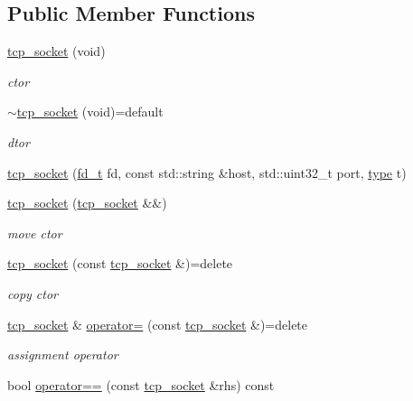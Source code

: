 \subsection*{Public Member Functions}
\begin{DoxyCompactItemize}
\item 
\hyperlink{classtacopie_1_1tcp__socket_a88ed1cadb0263591c4d31805e0a1a001}{tcp\+\_\+socket} (void)
\begin{DoxyCompactList}\small\item\em ctor \end{DoxyCompactList}\item 
\hyperlink{classtacopie_1_1tcp__socket_a4bd737a76a2a326be03d704f79a35282}{$\sim$tcp\+\_\+socket} (void)=default
\begin{DoxyCompactList}\small\item\em dtor \end{DoxyCompactList}\item 
\hyperlink{classtacopie_1_1tcp__socket_a191ffa48e0753ad4ec87d4d3a4a97822}{tcp\+\_\+socket} (\hyperlink{namespacetacopie_acce7ad26b2d30156b1e6fa353f727026}{fd\+\_\+t} fd, const std\+::string \&host, std\+::uint32\+\_\+t port, \hyperlink{classtacopie_1_1tcp__socket_ad8376e85df96ab9523f5d079ed7172ab}{type} t)
\item 
\hyperlink{classtacopie_1_1tcp__socket_a64f69cd1c185b523b543d4ea53cee1a2}{tcp\+\_\+socket} (\hyperlink{classtacopie_1_1tcp__socket}{tcp\+\_\+socket} \&\&)
\begin{DoxyCompactList}\small\item\em move ctor \end{DoxyCompactList}\item 
\hyperlink{classtacopie_1_1tcp__socket_a5ae1a5b0f9713ef256164afdbeb1c193}{tcp\+\_\+socket} (const \hyperlink{classtacopie_1_1tcp__socket}{tcp\+\_\+socket} \&)=delete
\begin{DoxyCompactList}\small\item\em copy ctor \end{DoxyCompactList}\item 
\hyperlink{classtacopie_1_1tcp__socket}{tcp\+\_\+socket} \& \hyperlink{classtacopie_1_1tcp__socket_aae3234c92bd36d5a614e44472d42bbf4}{operator=} (const \hyperlink{classtacopie_1_1tcp__socket}{tcp\+\_\+socket} \&)=delete
\begin{DoxyCompactList}\small\item\em assignment operator \end{DoxyCompactList}\item 
bool \hyperlink{classtacopie_1_1tcp__socket_a69fde61058ab72d88ce48f557d8216cf}{operator==} (const \hyperlink{classtacopie_1_1tcp__socket}{tcp\+\_\+socket} \&rhs) const

\end{DoxyCompactItemize}
